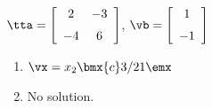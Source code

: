 {$\tta = \left[ \begin {array}{cc} 2&-3\\\noalign{\medskip}-4&6\end {array}
\right]$, $\vb=\left[ \begin {array}{c} 1\\\noalign{\medskip}-1\end {array}
 \right]$}
{\begin{enumerate}
\item	 $\vx=x_2\bmx{c}3/2\\1\emx$
\item	 No solution.
\end{enumerate}
 }








